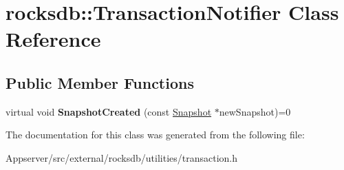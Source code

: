 \hypertarget{classrocksdb_1_1TransactionNotifier}{}\section{rocksdb\+:\+:Transaction\+Notifier Class Reference}
\label{classrocksdb_1_1TransactionNotifier}
\subsection*{Public Member Functions}
\begin{DoxyCompactItemize}
\item 
virtual void {\bfseries Snapshot\+Created} (const \hyperlink{classrocksdb_1_1Snapshot}{Snapshot} $\ast$new\+Snapshot)=0\hypertarget{classrocksdb_1_1TransactionNotifier_aa34bf4d8f0a70d8fbfa2f3c8f08a8592}{}\label{classrocksdb_1_1TransactionNotifier_aa34bf4d8f0a70d8fbfa2f3c8f08a8592}

\end{DoxyCompactItemize}


The documentation for this class was generated from the following file\+:\begin{DoxyCompactItemize}
\item 
Appserver/src/external/rocksdb/utilities/transaction.\+h\end{DoxyCompactItemize}
